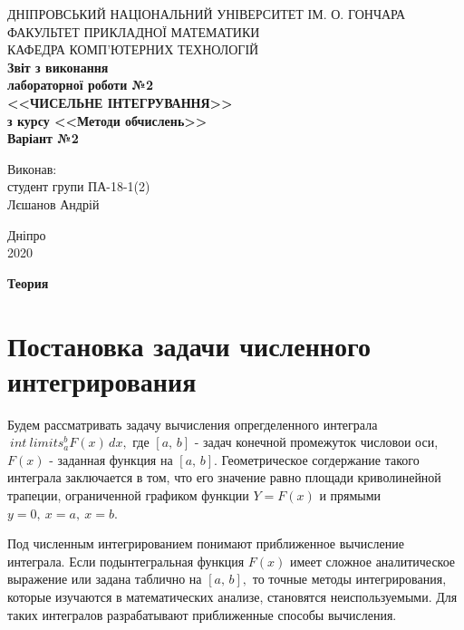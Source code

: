 \documentclass[14pt,a4paper,titlepage]{extarticle}
\begin{document}
      \begin{titlepage}
         \begin{center}
ДНІПРОВСЬКИЙ НАЦІОНАЛЬНИЙ УНІВЕРСИТЕТ ІМ. О. ГОНЧАРА\\
ФАКУЛЬТЕТ ПРИКЛАДНОЇ МАТЕМАТИКИ\\
КАФЕДРА КОМП'ЮТЕРНИХ ТЕХНОЛОГІЙ\\
            \vspace{6cm}
            \bf Звіт з виконання\\
            \bf лабораторної роботи №2\\
            \bf <<ЧИСЕЛЬНЕ ІНТЕГРУВАННЯ>>\\
            \bf з курсу <<Методи обчислень>>\\
            \bf Варіант №2
        \end{center}
        \vspace{3cm}
        \begin{flushright}
Виконав:\\
студент групи ПА-18-1(2)\\
Лєшанов Андрій
        \end{flushright}
        \begin{center}
        \vspace{4.5cm}
        Дніпро\\
         2020
        \end{center}
   \end{titlepage}
\setcounter{page}{2}
\newpage
{\centering\tableofcontents}
\newpage
\newpage


{\centering\bf\large Теория\par}

{\centering \section*{Постановка задачи численного интегрирования}}

Будем рассматривать задачу вычисления опрегделенного интеграла $ \ int \ limits_a ^ b F (x) \, dx, $ где $ [a, \, b] $ - задач конечной промежуток числовои оси, $ F (x) $ - заданная функция на $ [a, \, b]. $ Геометрическое согдержание такого интеграла заключается в том, что его значение равно площади криволинейной трапеции, ограниченной графиком функции
$ Y = F (x) $ и прямыми $ y = 0, \ x = a, \ x = b. $

Под численным интегрированием понимают приближенное вычисление интеграла. Если подынтегральная функция $ F (x) $ имеет сложное аналитическое выражение или задана таблично на $ [a, \, b], $ то точные методы интегрирования, которые изучаются в математических анализе, становятся неиспользуемыми. Для таких интегралов разрабатывают приближенные способы вычисления.
\end{document}
